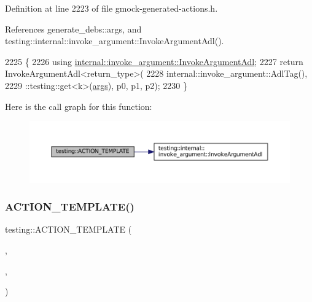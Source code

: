 Definition at line 2223 of file gmock-\/generated-\/actions.\+h.



References generate\+\_\+debs\+::args, and testing\+::internal\+::invoke\+\_\+argument\+::\+Invoke\+Argument\+Adl().


\begin{DoxyCode}
2225                                                 \{
2226   \textcolor{keyword}{using} \hyperlink{namespacetesting_1_1internal_1_1invoke__argument_abd36164191a3e386c50243074854b272}{internal::invoke\_argument::InvokeArgumentAdl};
2227   \textcolor{keywordflow}{return} InvokeArgumentAdl<return\_type>(
2228       internal::invoke\_argument::AdlTag(),
2229       ::testing::get<k>(\hyperlink{namespacegenerate__debs_a75f9143e38df82d83b2e8a6f99cae02c}{args}), p0, p1, p2);
2230 \}
\end{DoxyCode}
Here is the call graph for this function\+:
\nopagebreak
\begin{figure}[H]
\begin{center}
\leavevmode
\includegraphics[width=350pt]{namespacetesting_ac50647216fdf5197899a3d5034a9a670_cgraph}
\end{center}
\end{figure}
\mbox{\label{namespacetesting_ae98e43eecf8f44990b39b460f00b397b}} 
\subsubsection{\texorpdfstring{A\+C\+T\+I\+O\+N\+\_\+\+T\+E\+M\+P\+L\+A\+T\+E()}{ACTION\_TEMPLATE()}\hspace{0.1cm}{\footnotesize\ttfamily [11/28]}}
{\footnotesize\ttfamily testing\+::\+A\+C\+T\+I\+O\+N\+\_\+\+T\+E\+M\+P\+L\+A\+TE (\begin{DoxyParamCaption}\item[{Invoke\+Argument}]{,  }\item[{H\+A\+S\+\_\+1\+\_\+\+T\+E\+M\+P\+L\+A\+T\+E\+\_\+\+P\+A\+R\+A\+MS(int, k)}]{,  }\item[{A\+N\+D\+\_\+4\+\_\+\+V\+A\+L\+U\+E\+\_\+\+P\+A\+R\+A\+MS(p0, p1, p2, p3)}]{ }\end{DoxyParamCaption})}



